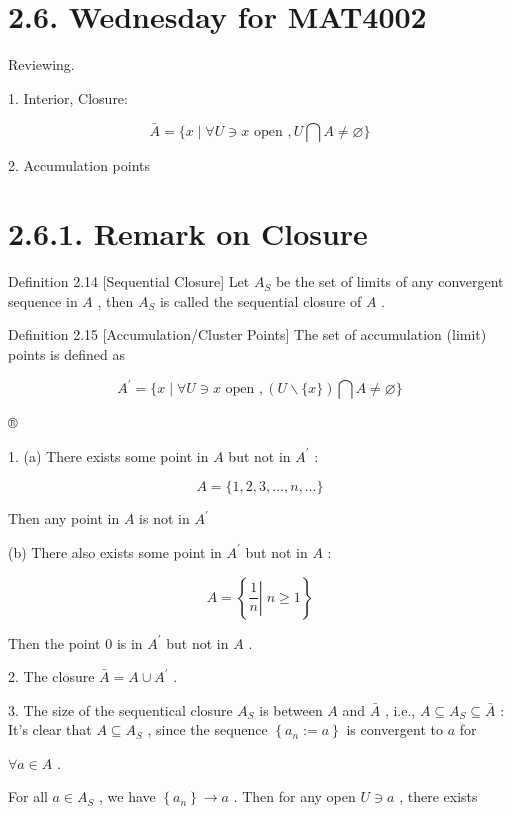 \section*{2.6. Wednesday for MAT4002}

Reviewing.

1. Interior, Closure:

\[
\bar{A} = \{ x \mid  \forall U \ni  x\text{ open },U\bigcap A \neq  \varnothing \}
\]

2. Accumulation points

\section*{2.6.1. Remark on Closure}

Definition 2.14 [Sequential Closure] Let \({A}_{S}\) be the set of limits of any convergent sequence in \(A\) , then \({A}_{S}\) is called the sequential closure of \(A\) .

Definition 2.15 [Accumulation/Cluster Points] The set of accumulation (limit) points is defined as

\[
{A}^{\prime } = \{ x \mid  \forall U \ni  x\text{ open },\left( {U\smallsetminus \{ x\} }\right) \bigcap A \neq  \varnothing \}
\]

®

1. (a) There exists some point in \(A\) but not in \({A}^{\prime }\) :

\[
A = \{ 1,2,3,\ldots ,n,\ldots \}
\]

Then any point in \(A\) is not in \({A}^{\prime }\)

(b) There also exists some point in \({A}^{\prime }\) but not in \(A\) :

\[
A = \left\{  {\left. \frac{1}{n}\right| \;n \geq  1}\right\}
\]

Then the point 0 is in \({A}^{\prime }\) but not in \(A\) .

2. The closure \(\bar{A} = A \cup  {A}^{\prime }\) .

3. The size of the sequentical closure \({A}_{S}\) is between \(A\) and \(\bar{A}\) , i.e., \(A \subseteq  {A}_{S} \subseteq  \bar{A}\) : It’s clear that \(A \subseteq  {A}_{S}\) , since the sequence \(\left\{  {{a}_{n} \mathrel{\text{ := }} a}\right\}\) is convergent to \(a\) for

\(\forall a \in  A\) .

For all \(a \in  {A}_{S}\) , we have \(\left\{  {a}_{n}\right\}   \rightarrow  a\) . Then for any open \(U \ni  a\) , there exists

